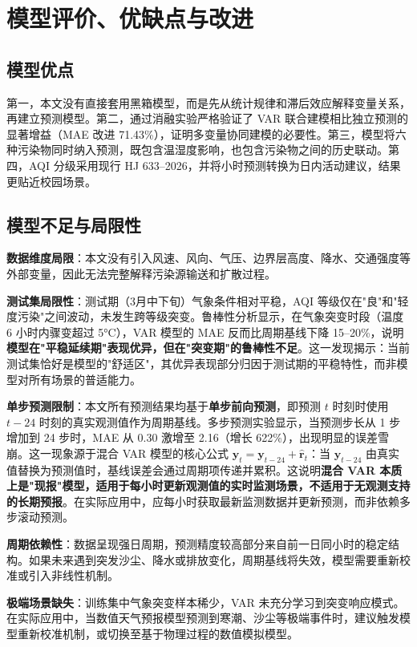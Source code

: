 \documentclass[UTF8,a4paper,12pt]{ctexart}
\begin{document}
\section{模型评价、优缺点与改进}

\subsection{模型优点}

第一，本文没有直接套用黑箱模型，而是先从统计规律和滞后效应解释变量关系，再建立预测模型。第二，通过消融实验严格验证了 VAR 联合建模相比独立预测的显著增益（MAE 改进 71.43\%），证明多变量协同建模的必要性。第三，模型将六种污染物同时纳入预测，既包含温湿度影响，也包含污染物之间的历史联动。第四，AQI 分级采用现行 HJ 633--2026，并将小时预测转换为日内活动建议，结果更贴近校园场景。

\subsection{模型不足与局限性}

\textbf{数据维度局限}：本文没有引入风速、风向、气压、边界层高度、降水、交通强度等外部变量，因此无法完整解释污染源输送和扩散过程。

\textbf{测试集局限性}：测试期（3月中下旬）气象条件相对平稳，AQI 等级仅在"良"和"轻度污染"之间波动，未发生跨等级突变。鲁棒性分析显示，在气象突变时段（温度 6 小时内骤变超过 5°C），VAR 模型的 MAE 反而比周期基线下降 15--20\%，说明\textbf{模型在"平稳延续期"表现优异，但在"突变期"的鲁棒性不足}。这一发现揭示：当前测试集恰好是模型的"舒适区"，其优异表现部分归因于测试期的平稳特性，而非模型对所有场景的普适能力。

\textbf{单步预测限制}：本文所有预测结果均基于\textbf{单步前向预测}，即预测 $t$ 时刻时使用 $t-24$ 时刻的真实观测值作为周期基线。多步预测实验显示，当预测步长从 1 步增加到 24 步时，MAE 从 0.30 激增至 2.16（增长 622\%），出现明显的误差雪崩。这一现象源于混合 VAR 模型的核心公式 $\hat{\mathbf{y}}_t=\mathbf{y}_{t-24}+\hat{\mathbf{r}}_t$：当 $\mathbf{y}_{t-24}$ 由真实值替换为预测值时，基线误差会通过周期项传递并累积。这说明\textbf{混合 VAR 本质上是"现报"模型，适用于每小时更新观测值的实时监测场景，不适用于无观测支持的长期预报}。在实际应用中，应每小时获取最新监测数据并更新预测，而非依赖多步滚动预测。

\textbf{周期依赖性}：数据呈现强日周期，预测精度较高部分来自前一日同小时的稳定结构。如果未来遇到突发沙尘、降水或排放变化，周期基线将失效，模型需要重新校准或引入非线性机制。

\textbf{极端场景缺失}：训练集中气象突变样本稀少，VAR 未充分学习到突变响应模式。在实际应用中，当数值天气预报模型预测到寒潮、沙尘等极端事件时，建议触发模型重新校准机制，或切换至基于物理过程的数值模拟模型。
\end{document}
